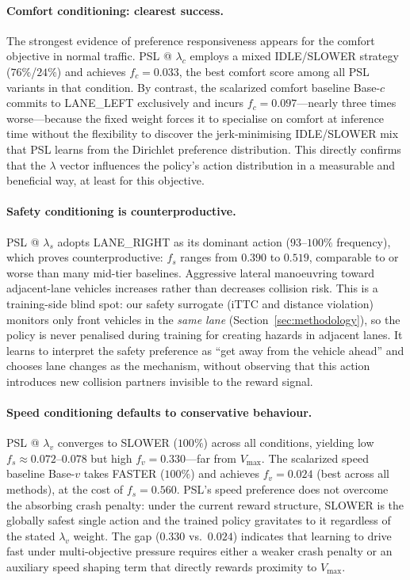 \documentclass[12pt, letterpaper]{article}
\begin{document}
\paragraph{Comfort conditioning: clearest success.}
The strongest evidence of preference responsiveness appears for the comfort objective in normal traffic.
PSL @ $\lambda_c$ employs a mixed IDLE/SLOWER strategy ($76\%$/$24\%$) and achieves $f_c = 0.033$, the best comfort score among all PSL variants in that condition.
By contrast, the scalarized comfort baseline Base-$c$ commits to LANE\_LEFT exclusively and incurs $f_c = 0.097$---nearly three times worse---because the fixed weight forces it to specialise on comfort at inference time without the flexibility to discover the jerk-minimising IDLE/SLOWER mix that PSL learns from the Dirichlet preference distribution.
This directly confirms that the $\lambda$ vector influences the policy's action distribution in a measurable and beneficial way, at least for this objective.

\paragraph{Safety conditioning is counterproductive.}
PSL @ $\lambda_s$ adopts LANE\_RIGHT as its dominant action ($93$--$100\%$ frequency), which proves counterproductive: $f_s$ ranges from $0.390$ to $0.519$, comparable to or worse than many mid-tier baselines.
Aggressive lateral manoeuvring toward adjacent-lane vehicles increases rather than decreases collision risk.
This is a training-side blind spot: our safety surrogate (iTTC and distance violation) monitors only front vehicles in the \emph{same lane} (Section~\ref{sec:methodology}), so the policy is never penalised during training for creating hazards in adjacent lanes.
It learns to interpret the safety preference as ``get away from the vehicle ahead'' and chooses lane changes as the mechanism, without observing that this action introduces new collision partners invisible to the reward signal.

\paragraph{Speed conditioning defaults to conservative behaviour.}
PSL @ $\lambda_v$ converges to SLOWER ($100\%$) across all conditions, yielding low $f_s \approx 0.072$--$0.078$ but high $f_v = 0.330$---far from $V_{\max}$.
The scalarized speed baseline Base-$v$ takes FASTER ($100\%$) and achieves $f_v = 0.024$ (best across all methods), at the cost of $f_s = 0.560$.
PSL's speed preference does not overcome the absorbing crash penalty: under the current reward structure, SLOWER is the globally safest single action and the trained policy gravitates to it regardless of the stated $\lambda_v$ weight.
The gap ($0.330$ vs.\ $0.024$) indicates that learning to drive fast under multi-objective pressure requires either a weaker crash penalty or an auxiliary speed shaping term that directly rewards proximity to $V_{\max}$.
\end{document}
